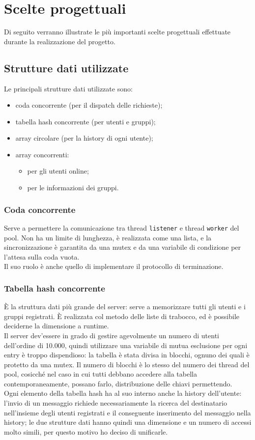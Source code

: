 \section{Scelte progettuali}
Di seguito verranno illustrate le più importanti scelte progettuali effettuate durante la realizzazione del progetto.
 
\subsection{Strutture dati utilizzate}
Le principali strutture dati utilizzate sono:
\begin{itemize}
	\item coda concorrente (per il dispatch delle richieste);
	\item tabella hash concorrente (per utenti e gruppi);
	\item array circolare (per la history di ogni utente);
	\item array concorrenti:
	\begin{itemize}
		\item per gli utenti online;
		\item per le informazioni dei gruppi.
	\end{itemize}
\end{itemize}

\subsubsection{Coda concorrente}
Serve a permettere la comunicazione tra thread \texttt{listener} e thread \texttt{worker} del pool. Non ha un limite di lunghezza, è realizzata come una lista, e la sincronizzazione è garantita da una mutex e da una variabile di condizione per l'attesa sulla coda vuota.\\
Il suo ruolo è anche quello di implementare il protocollo di terminazione.

\subsubsection{Tabella hash concorrente}
È la struttura dati più grande del server: serve a memorizzare tutti gli utenti e i gruppi registrati. È realizzata col metodo delle liste di trabocco, ed è possibile deciderne la dimensione a runtime.\\
Il server dev'essere in grado di gestire agevolmente un numero di utenti dell'ordine di 10.000, quindi utilizzare una variabile di mutua esclusione per ogni entry è troppo dispendioso: la tabella è stata divisa in blocchi, ognuno dei quali è protetto da una mutex. Il numero di blocchi è lo stesso del numero dei thread del pool, cosicché nel caso in cui tutti debbano accedere alla tabella contemporaneamente, possano farlo, distribuzione delle chiavi permettendo.\\
Ogni elemento della tabella hash ha al suo interno anche la history dell'utente: l'invio di un messaggio richiede necessariamente la ricerca del destinatario nell'insieme degli utenti registrati e il conseguente inserimento del messaggio nella history; le due strutture dati hanno quindi una dimensione e un numero di accessi molto simili, per questo motivo ho deciso di unificarle.

